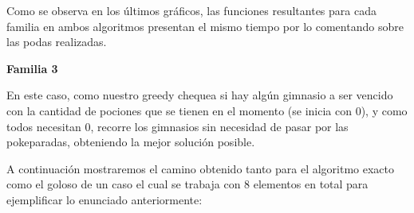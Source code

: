 \begin{figure} 
 \centering
       \label{fig:fam1medicion}
    \label{fig:fam2medicion}
    \end{figure}

Como se observa en los \'ultimos gr\'aficos, las funciones resultantes para cada familia en ambos algoritmos presentan el mismo tiempo por lo comentando sobre las podas realizadas.

\begin{center}
\textbf{Familia 3}
\end{center}

En este caso, como nuestro greedy chequea si hay alg\'un gimnasio a ser vencido con la cantidad de pociones que se tienen en el momento (se inicia con 0), y como todos necesitan 0, recorre los gimnasios sin necesidad de pasar por las pokeparadas, obteniendo la mejor soluci\'on posible.

A continuaci\'on mostraremos el camino obtenido tanto para el algoritmo exacto como el goloso de un caso el cual se trabaja con 8 elementos en total para ejemplificar lo enunciado anteriormente:

